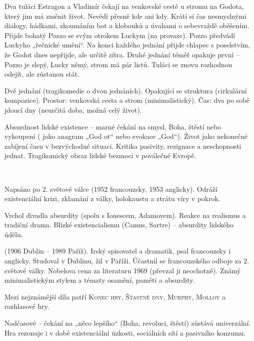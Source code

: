 \documentclass[FGBook.tex]{subfiles}
\begin{document}
\noindent Dva tuláci Estragon a Vladimír čekají na venkovské cestě u stromu na Godota, který jim má změnit život. Nevědí přesně kde ani kdy. Krátí si čas nesmyslnými dialogy, hádkami, zkoumáním bot a klobouků a úvahami o sebevraždě oběšením. Přijde bohatý Pozzo se svým otrokem Luckym (na provaze). Pozzo předvádí Luckyho „řečnické umění“. Na konci každého jednání přijde chlapec s poselstvím, že Godot dnes nepřijde, ale určitě zítra. Druhé jednání téměř opakuje první – Pozzo je slepý, Lucky němý, strom má pár listů. Tuláci se znovu rozhodnou odejít, ale zůstanou stát.

\noindent Dvě jednání (tragikomedie o dvou jednáních). Opakující se struktura (cirkulární kompozice). Prostor: venkovská cesta a strom (minimalistický). Čas: dva po sobě jdoucí dny (neurčitá doba, možná celý život).

\noindent Absurdnost lidské existence – marné čekání na smysl, Boha, štěstí nebo vykoupení ( jako anagram „God ot“ nebo evokace „God“). Život jako nekonečné zabíjení času v bezvýchodné situaci. Kritika pasivity, rezignace a neschopnosti jednat. Tragikomický obraz lidské bezmoci v poválečné Evropě.

\vspace*{2em}\\

\noindent Napsáno po 2. světové válce (1952 francouzsky, 1953 anglicky). Odráží existenciální krizi, zklamání z války, holokaustu a ztrátu víry v pokrok.

\noindent Vrchol divadla absurdity (spolu s Ionescem, Adamovem). Reakce na realismus a tradiční drama. Blízké existencialismu (Camus, Sartre) – absurdity lidského údělu.

\noindent (1906 Dublin – 1989 Paříž). Irský spisovatel a dramatik, psal francouzsky i anglicky. Studoval v Dublinu, žil v Paříži. Účastnil se francouzského odboje za 2. světové války. Nobelova cena za literaturu 1969 (převzal ji neochotně). Známý minimalistickým stylem a tématy osamění, paměti a absurdity.

\noindent Mezi nejznámější díla patří \textsc{Konec hry}, \textsc{Šťastné dny}, \textsc{Murphy}, \textsc{Molloy} a rozhlasové hry.

\noindent Nadčasové – čekání na „něco lepšího“ (Boha, revoluci, štěstí) zůstává univerzální. Hra rezonuje i v době existenciální úzkosti, sociálních sítí a pasivního konzumu.
\end{document}
